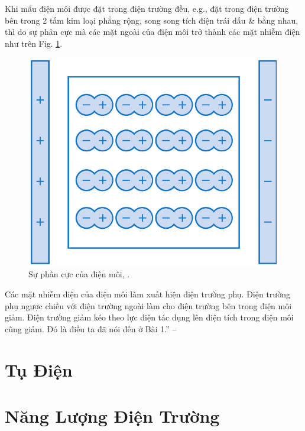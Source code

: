 \documentclass[oneside]{book}
\numberwithin{equation}{section}
\begin{document}
Khi mẩu điện môi được đặt trong điện trường đều, e.g., đặt trong điện trường bên trong 2 tấm kim loại phẳng rộng, song song tích điện trái dấu \& bằng nhau, thì do sự phân cực mà các mặt ngoài của điện môi trở thành các mặt nhiễm điện như trên Fig. \ref{fig:phan_cuc_dien_moi}.

\begin{figure}[H]
	\centering
	\includegraphics[scale=0.15]{phan_cuc_dien_moi}
	\caption{Sự phân cực của điện môi, \cite[Hình 6.5, p. 30]{SGK_Vat_Ly_11_nang_cao}.}
	\label{fig:phan_cuc_dien_moi}
\end{figure}
Các mặt nhiễm điện của điện môi làm xuất hiện điện trường phụ. Điện trường phụ ngược chiều với điện trường ngoài làm cho điện trường bên trong điện môi giảm. Điện trường giảm kéo theo lực điện tác dụng lên điện tích trong điện môi cũng giảm. Đó là điều ta đã nói đến ở Bài 1.'' -- \cite[p. 30]{SGK_Vat_Ly_11_nang_cao}


\section{Tụ Điện}


\section{Năng Lượng Điện Trường}
\end{document}
